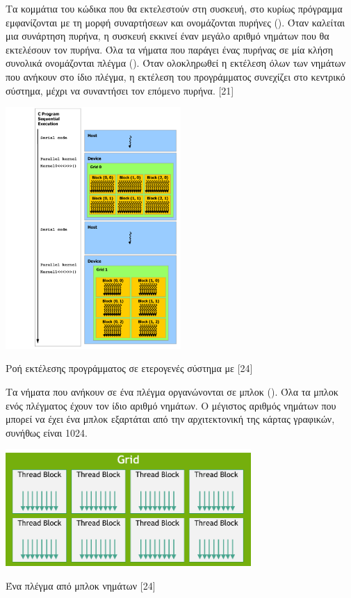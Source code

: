 Τα κομμάτια του κώδικα που θα εκτελεστούν στη συσκευή, στο κυρίως πρόγραμμα εμφανίζονται με τη μορφή συναρτήσεων και ονομάζονται πυρήνες (). Όταν καλείται μια συνάρτηση πυρήνα, η συσκευή εκκινεί έναν μεγάλο αριθμό νημάτων που θα εκτελέσουν τον πυρήνα. Όλα τα νήματα που παράγει ένας πυρήνας σε μία κλήση συνολικά ονομάζονται πλέγμα (). Όταν ολοκληρωθεί η εκτέλεση όλων των νημάτων που ανήκουν στο ίδιο πλέγμα, η εκτέλεση του προγράμματος συνεχίζει στο κεντρικό σύστημα, μέχρι να συναντήσει τον επόμενο πυρήνα. [21]
 
\begin{Illustration}[!h] 
	\centering
	\includegraphics[width=0.5\textwidth]{images/image048.png} 
	\caption{Ροή εκτέλεσης προγράμματος σε ετερογενές σύστημα με  [24]}
	\label{image-3.5}
\end{Illustration}

Τα νήματα που ανήκουν σε ένα πλέγμα οργανώνονται σε μπλοκ (). Όλα τα μπλοκ ενός πλέγματος έχουν τον ίδιο αριθμό νημάτων. Ο μέγιστος αριθμός νημάτων που μπορεί να έχει ένα μπλοκ εξαρτάται από την αρχιτεκτονική της κάρτας γραφικών, συνήθως είναι 1024.
 
\begin{Illustration}[!h] 
	\centering
	\includegraphics[width=0.7\textwidth]{images/image049.png} 
	\caption{Ένα πλέγμα από μπλοκ νημάτων [24]}
	\label{image-3.6}
\end{Illustration}

